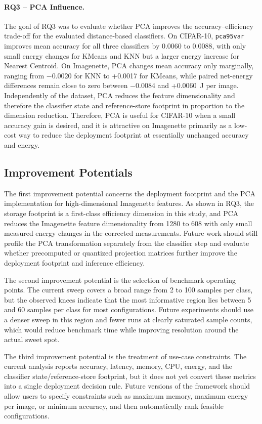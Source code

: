 \documentclass[sigconf,review]{acmart}
\begin{document}
\paragraph{RQ3 -- PCA Influence.}
The goal of RQ3 was to evaluate whether PCA improves the accuracy--efficiency trade-off for the evaluated distance-based classifiers.
On CIFAR-10, \texttt{pca95var} improves mean accuracy for all three classifiers by 0.0060 to 0.0088, with only small energy changes for KMeans and KNN but a larger energy increase for Nearest Centroid.
On Imagenette, PCA changes mean accuracy only marginally, ranging from $-$0.0020 for KNN to +0.0017 for KMeans, while paired net-energy differences remain close to zero between $-$0.0084 and +0.0060~J per image.
Independently of the dataset, PCA reduces the feature dimensionality and therefore the classifier state and reference-store footprint in proportion to the dimension reduction.
Therefore, PCA is useful for CIFAR-10 when a small accuracy gain is desired, and it is attractive on Imagenette primarily as a low-cost way to reduce the deployment footprint at essentially unchanged accuracy and energy.

\subsection{Improvement Potentials}
The first improvement potential concerns the deployment footprint and the PCA implementation for high-dimensional Imagenette features.
As shown in RQ3, the storage footprint is a first-class efficiency dimension in this study, and PCA reduces the Imagenette feature dimensionality from 1280 to 608 with only small measured energy changes in the corrected measurements.
Future work should still profile the PCA transformation separately from the classifier step and evaluate whether precomputed or quantized projection matrices further improve the deployment footprint and inference efficiency.

The second improvement potential is the selection of benchmark operating points.
The current sweep covers a broad range from 2 to 100 samples per class, but the observed knees indicate that the most informative region lies between 5 and 60 samples per class for most configurations.
Future experiments should use a denser sweep in this region and fewer runs at clearly saturated sample counts, which would reduce benchmark time while improving resolution around the actual sweet spot.

The third improvement potential is the treatment of use-case constraints.
The current analysis reports accuracy, latency, memory, CPU, energy, and the classifier state/reference-store footprint, but it does not yet convert these metrics into a single deployment decision rule.
Future versions of the framework should allow users to specify constraints such as maximum memory, maximum energy per image, or minimum accuracy, and then automatically rank feasible configurations.
\end{document}
